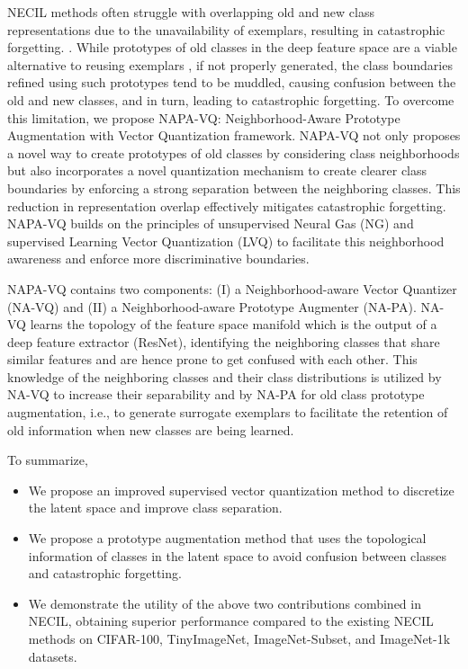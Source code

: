 \documentclass[10pt,twocolumn,letterpaper]{article}
\begin{document}
NECIL methods often struggle with overlapping old and new class representations due to the unavailability of exemplars, resulting in catastrophic forgetting. \cite{Zhu2021PrototypeLearning}.
While prototypes of old classes in the deep feature space are a viable alternative to reusing exemplars \cite{Zhu2021PrototypeLearning, Zhu2021Class-IncrementalAugmentation}, if not properly generated, the class boundaries refined using such prototypes tend to be muddled, causing confusion between the old and new classes, and in turn, leading to catastrophic forgetting. To overcome this limitation, we propose NAPA-VQ: Neighborhood-Aware Prototype Augmentation with Vector Quantization framework. NAPA-VQ not only proposes a novel way to create prototypes of old classes by considering class neighborhoods but also incorporates a novel quantization mechanism to create clearer class boundaries by enforcing a strong separation between the neighboring classes. This reduction in representation overlap effectively mitigates catastrophic forgetting. NAPA-VQ builds on the principles of unsupervised Neural Gas (NG) \cite{ThomasMartinetzandKlausSchulten1991ATopologies} and supervised Learning Vector Quantization (LVQ) \cite{Kohonen1990ImprovedQuantization} to facilitate this neighborhood awareness and enforce more discriminative boundaries. 

NAPA-VQ contains two  components: (I) a Neighborhood-aware Vector Quantizer (NA-VQ) and (II) a Neighborhood-aware Prototype Augmenter  (NA-PA).  NA-VQ learns the topology of the feature space manifold  which is the output of a deep feature extractor (\eg ResNet), identifying the neighboring classes that share similar features and are hence prone to get confused with each other. This knowledge of the neighboring classes and their class distributions is utilized by NA-VQ to increase their separability and by NA-PA for old class prototype augmentation, i.e., to generate surrogate exemplars to facilitate the retention of old information when new classes are being learned.

To summarize,
\begin{itemize}
  \item We propose an improved supervised vector quantization method to discretize the latent space and improve class separation.
  \item We propose a prototype augmentation method that uses the topological information of classes in the latent space to avoid confusion between classes and catastrophic forgetting.
    \item We demonstrate the utility of the above two contributions combined in NECIL, obtaining superior performance compared to the existing NECIL methods on CIFAR-100, TinyImageNet, ImageNet-Subset, and ImageNet-1k datasets.
\end{itemize}
\end{document}
